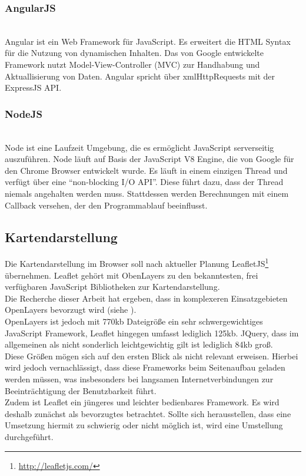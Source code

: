 \documentclass[10pt,conference,compsocconf]{IEEEtran}
\begin{document}
\subsubsection{AngularJS}\hspace*{\fill} \\
Angular ist ein Web Framework für JavaScript. Es erweitert die HTML Syntax für die Nutzung von dynamischen Inhalten. Das von Google entwickelte Framework nutzt Model-View-Controller (MVC) zur Handhabung und Aktuallisierung von Daten. Angular spricht über xmlHttpRequests mit der ExpressJS API.\vspace{.5em}

\subsubsection{NodeJS}\hspace*{\fill} \\
Node ist eine Laufzeit Umgebung, die es ermöglicht JavaScript serverseitig auszuführen. Node läuft auf Basis der JavaScript V8 Engine, die von Google für den Chrome Browser entwickelt wurde. Es läuft in einem einzigen Thread und verfügt über eine \enquote{non-blocking I/O API}. Diese führt dazu, dass der Thread niemals angehalten werden muss. Stattdessen werden Berechnungen mit einem Callback versehen, der den Programmablauf beeinflusst.

\subsection{Kartendarstellung}
Die Kartendarstellung im Browser soll nach aktueller Planung LeafletJS\footnote{\url{http://leafletjs.com/}} übernehmen. Leaflet gehört mit ObenLayers zu den bekanntesten, frei verfügbaren JavaScript Bibliotheken zur Kartendarstellung.\\
Die Recherche dieser Arbeit hat ergeben, dass in komplexeren Einsatzgebieten OpenLayers bevorzugt wird (siehe \cite{mariuszMaster} \cite{quads} \cite{wms_flow_mapping}).\\
OpenLayers ist jedoch mit 770kb Dateigröße ein sehr schwergewichtiges JavaScript Framework, Leaflet hingegen umfasst lediglich 125kb. JQuery, dass im allgemeinen als nicht sonderlich leichtgewichtig gilt ist lediglich 84kb groß.\\
Diese Größen mögen sich auf den ersten Blick als nicht relevant erweisen. Hierbei wird jedoch vernachlässigt, dass diese Frameworks beim Seitenaufbau geladen werden müssen, was insbesonders bei langsamen Internetverbindungen zur Beeinträchtigung der Benutzbarkeit führt.\\
Zudem ist Leaflet ein jüngeres und leichter bedienbares Framework. Es wird deshalb zunächst als bevorzugtes betrachtet. Sollte sich herausstellen, dass eine Umsetzung hiermit zu schwierig oder nicht möglich ist, wird eine Umstellung durchgeführt.
\end{document}
